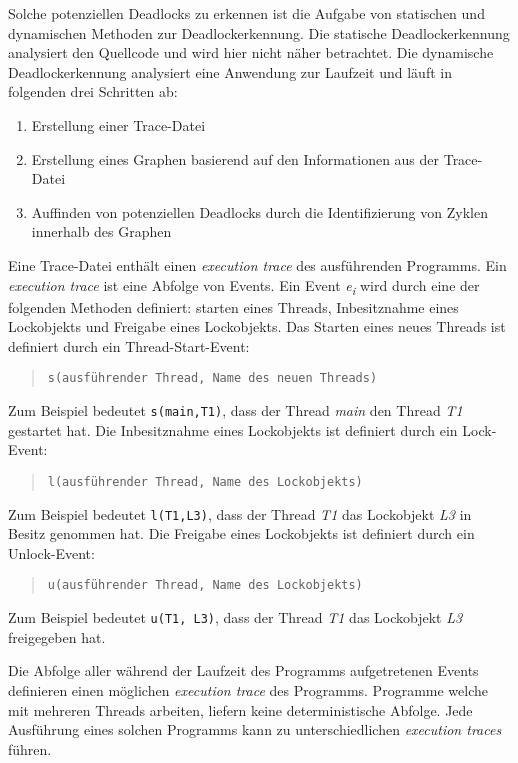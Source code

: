 Solche potenziellen Deadlocks zu erkennen ist die Aufgabe von statischen und
dynamischen Methoden zur Deadlockerkennung. Die statische Deadlockerkennung
analysiert den Quellcode und wird hier nicht näher betrachtet. Die dynamische
Deadlockerkennung analysiert eine Anwendung zur Laufzeit und läuft in folgenden
drei Schritten ab:
\begin{enumerate}
  \item Erstellung einer Trace-Datei
  \item Erstellung eines Graphen basierend auf den Informationen aus der
  Trace-Datei
  \item Auffinden von potenziellen Deadlocks durch die Identifizierung von
  Zyklen innerhalb des Graphen
\end{enumerate}

Eine Trace-Datei enthält einen \textit{execution
trace}\label{text:ExecutionTrace} des ausführenden Programms. Ein
\textit{execution trace} ist eine Abfolge von Events. Ein Event
\textit{e\textsubscript{i}} wird durch eine der folgenden Methoden definiert:
starten eines Threads, Inbesitznahme eines Lockobjekts und Freigabe eines
Lockobjekts. Das Starten eines neues Threads ist definiert durch ein
Thread-Start-Event:
\begin{quote}
\texttt{s(ausführender Thread, Name des neuen Threads)}
\end{quote}
Zum Beispiel bedeutet \texttt{s(main,T1)}, dass der Thread \textit{main} den
Thread \textit{T1} gestartet hat. Die Inbesitznahme eines Lockobjekts ist
definiert durch ein Lock-Event:
\begin{quote}
\texttt{l(ausführender Thread, Name des Lockobjekts)}
\end{quote}
Zum Beispiel bedeutet \texttt{l(T1,L3)}, dass der Thread \textit{T1} das
Lockobjekt \textit{L3} in Besitz genommen hat. Die Freigabe eines Lockobjekts
ist definiert durch ein Unlock-Event:
\begin{quote}
\texttt{u(ausführender Thread, Name des Lockobjekts)}
\end{quote}
Zum Beispiel bedeutet \texttt{u(T1, L3)}, dass der Thread \textit{T1} das
Lockobjekt \textit{L3} freigegeben hat.

Die Abfolge aller während der Laufzeit des Programms aufgetretenen Events
definieren einen möglichen \textit{execution trace} des Programms. Programme
welche mit mehreren Threads arbeiten, liefern keine deterministische Abfolge.
Jede Ausführung eines solchen Programms kann zu unterschiedlichen
\textit{execution traces} führen. 

